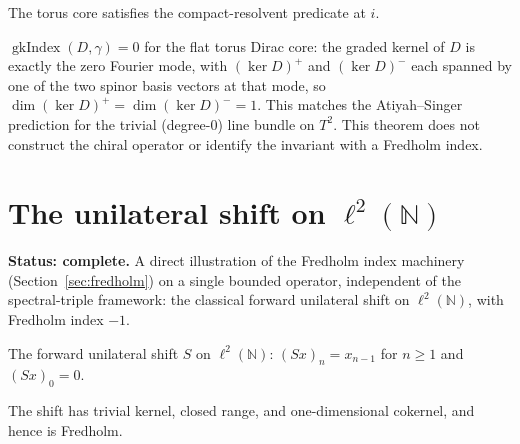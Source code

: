 \begin{theorem}
  \label{thm:torus-isCompactResolventSpectralTriple}
  \leanok
  The torus core satisfies the compact-resolvent predicate at $i$.
\end{theorem}

\begin{theorem}
  \label{thm:torus-index-eq-zero}
  \leanok
  $\operatorname{gkIndex}(D, \gamma) = 0$ for the flat torus Dirac core: the graded kernel of
  $D$ is exactly the zero Fourier mode, with $(\ker D)^{+}$ and $(\ker D)^{-}$ each spanned by
  one of the two spinor basis vectors at that mode, so $\dim(\ker D)^{+} = \dim(\ker D)^{-} =
  1$. This matches the Atiyah--Singer prediction for the trivial (degree-$0$) line bundle on
  $T^2$.  This theorem does not construct the chiral operator or identify the invariant with
  a Fredholm index.
\end{theorem}

\section{The unilateral shift on \texorpdfstring{$\ell^2(\mathbb{N})$}{l2(N)}}
\label{sec:shift}

\textbf{Status: complete.} A direct illustration of the Fredholm index machinery
(Section~\ref{sec:fredholm}) on a single bounded operator, independent of the spectral-triple
framework: the classical forward unilateral shift on $\ell^2(\mathbb{N})$, with Fredholm index
$-1$.

\begin{definition}
  \label{def:shift}
  \leanok
  The forward unilateral shift $S$ on $\ell^2(\mathbb{N})$: $(Sx)_n = x_{n-1}$ for $n \geq 1$
  and $(Sx)_0 = 0$.
\end{definition}

\begin{theorem}
  \label{thm:isFredholm-shift}
  \leanok
  The shift has trivial kernel, closed range, and one-dimensional cokernel, and hence is
  Fredholm.
\end{theorem}

